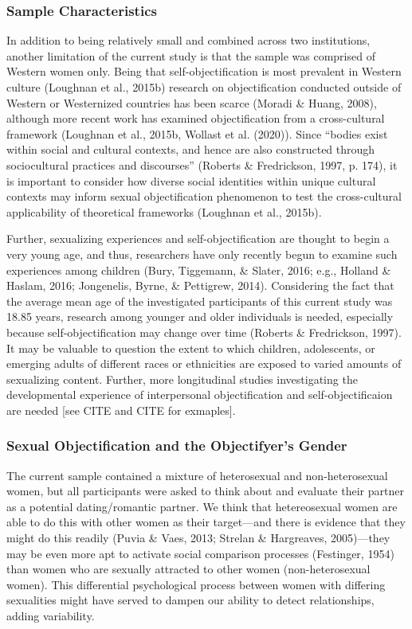 \documentclass[man]{apa6}
\begin{document}
\subsubsection{Sample Characteristics}\label{sample-characteristics}

In addition to being relatively small and combined across two
institutions, another limitation of the current study is that the sample
was comprised of Western women only. Being that self-objectification is
most prevalent in Western culture (Loughnan et al., 2015b) research on
objectification conducted outside of Western or Westernized countries
has been scarce (Moradi \& Huang, 2008), although more recent work has
examined objectification from a cross-cultural framework (Loughnan et
al., 2015b, Wollast et al. (2020)). Since \enquote{bodies exist within
social and cultural contexts, and hence are also constructed through
sociocultural practices and discourses} (Roberts \& Fredrickson, 1997,
p. 174), it is important to consider how diverse social identities
within unique cultural contexts may inform sexual objectification
phenomenon to test the cross-cultural applicability of theoretical
frameworks (Loughnan et al., 2015b).

Further, sexualizing experiences and self-objectification are thought to
begin a very young age, and thus, researchers have only recently begun
to examine such experiences among children (Bury, Tiggemann, \& Slater,
2016; e.g., Holland \& Haslam, 2016; Jongenelis, Byrne, \& Pettigrew,
2014). Considering the fact that the average mean age of the
investigated participants of this current study was 18.85 years,
research among younger and older individuals is needed, especially
because self-objectification may change over time (Roberts \&
Fredrickson, 1997). It may be valuable to question the extent to which
children, adolescents, or emerging adults of different races or
ethnicities are exposed to varied amounts of sexualizing content.
Further, more longitudinal studies investigating the developmental
experience of interpersonal objectification and self-objectificaion are
needed {[}see CITE and CITE for exmaples{]}.

\subsubsection{Sexual Objectification and the Objectifyer's
Gender}\label{sexual-objectification-and-the-objectifyers-gender}

The current sample contained a mixture of heterosexual and
non-heterosexual women, but all participants were asked to think about
and evaluate their partner as a potential dating/romantic partner. We
think that hetereosexual women are able to do this with other women as
their target---and there is evidence that they might do this readily
(Puvia \& Vaes, 2013; Strelan \& Hargreaves, 2005)---they may be even
more apt to activate social comparison processes (Festinger, 1954) than
women who are sexually attracted to other women (non-heterosexual
women). This differential psychological process between women with
differing sexualities might have served to dampen our ability to detect
relationships, adding variability.
\end{document}
